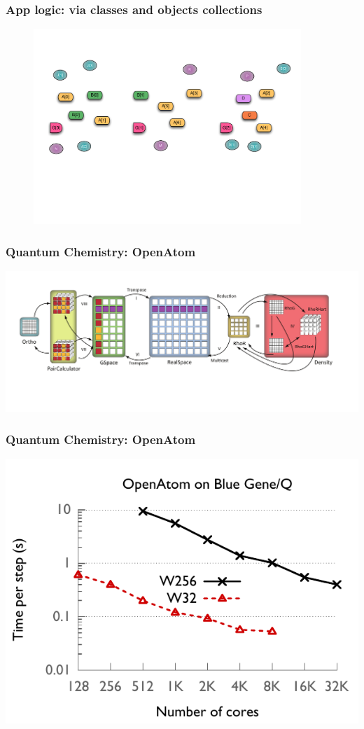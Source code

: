 \begin{frame}
  \frametitle{App logic: via classes and objects collections}
  \begin{figure}\includegraphics[width=0.9\textwidth]{../figures/progmodel/05-parallelism-via-obj-collections.pdf}\end{figure}
\end{frame}


\begin{frame}
\frametitle{Quantum Chemistry: OpenAtom}
\includegraphics[width=\textwidth]{../figures/openatom/control-flow.pdf}
\end{frame}


\begin{frame}
\frametitle{Quantum Chemistry: OpenAtom}
\includegraphics[width=\textwidth]{../figures/openatom/bgq.pdf}
\end{frame}


